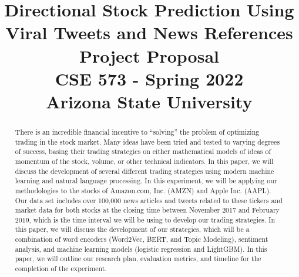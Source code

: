 \documentclass[conference]{IEEEtran}
\begin{document}
\title{%
  Directional Stock Prediction Using Viral Tweets and News References 
\\[.3in]
  \large Project Proposal \\
CSE 573 - Spring 2022 \\ 
Arizona State University \\
}


\author{
    \and
    \and
    \and
    \and

}




\maketitle

\begin{abstract}
    There is an incredible financial incentive to “solving” the problem of optimizing trading in the stock market. Many ideas have been tried and tested to varying degrees of success, basing their trading strategies on either mathematical models of ideas of momentum of the stock, volume, or other technical indicators. In this paper, we will discuss the development of several different trading strategies using modern machine learning and natural language processing. In this experiment, we will be applying our methodologies to the stocks of Amazon.com, Inc. (AMZN) and Apple Inc. (AAPL). Our data set includes over 100,000 news articles and tweets related to these tickers and market data for both stocks at the closing time between November 2017 and February 2019, which is the time interval we will be using to develop our trading strategies. In this paper, we will discuss the development of our strategies, which will be a combination of word encoders (Word2Vec, BERT, and Topic Modeling), sentiment analysis, and machine learning models (logistic regression and LightGBM). In this paper, we will outline our research plan, evaluation metrics, and timeline for the completion of the experiment.
\end{abstract}
\end{document}
